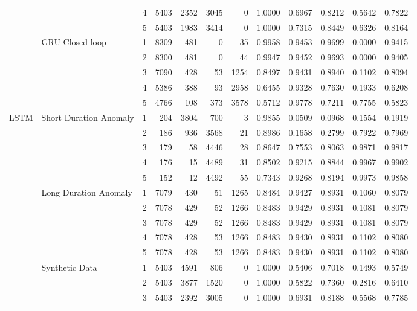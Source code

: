 \begin{table}[p]
{\begin{tabular}{|l|l|c|r|r|r|r|c|c|c|c|c|}
 &  & 4 & 5403 & 2352 & 3045 & 0 & 1.0000 & 0.6967 & 0.8212 & 0.5642 & 0.7822 \\
 &  & 5 & 5403 & 1983 & 3414 & 0 & 1.0000 & 0.7315 & 0.8449 & 0.6326 & 0.8164 \\
\cline{2-12}
 & \multirow{5}{*}{GRU Closed-loop} & 1 & 8309 & 481 & 0 & 35 & 0.9958 & 0.9453 & 0.9699 & 0.0000 & 0.9415 \\
 &  & 2 & 8300 & 481 & 0 & 44 & 0.9947 & 0.9452 & 0.9693 & 0.0000 & 0.9405 \\
 &  & 3 & 7090 & 428 & 53 & 1254 & 0.8497 & 0.9431 & 0.8940 & 0.1102 & 0.8094 \\
 &  & 4 & 5386 & 388 & 93 & 2958 & 0.6455 & 0.9328 & 0.7630 & 0.1933 & 0.6208 \\
 &  & 5 & 4766 & 108 & 373 & 3578 & 0.5712 & 0.9778 & 0.7211 & 0.7755 & 0.5823 \\
\hline
\multirow{20}{*}{LSTM} & \multirow{5}{*}{Short Duration Anomaly} & 1 & 204 & 3804 & 700 & 3 & 0.9855 & 0.0509 & 0.0968 & 0.1554 & 0.1919 \\
 &  & 2 & 186 & 936 & 3568 & 21 & 0.8986 & 0.1658 & 0.2799 & 0.7922 & 0.7969 \\
 &  & 3 & 179 & 58 & 4446 & 28 & 0.8647 & 0.7553 & 0.8063 & 0.9871 & 0.9817 \\
 &  & 4 & 176 & 15 & 4489 & 31 & 0.8502 & 0.9215 & 0.8844 & 0.9967 & 0.9902 \\
 &  & 5 & 152 & 12 & 4492 & 55 & 0.7343 & 0.9268 & 0.8194 & 0.9973 & 0.9858 \\
\cline{2-12}
 & \multirow{5}{*}{Long Duration Anomaly} & 1 & 7079 & 430 & 51 & 1265 & 0.8484 & 0.9427 & 0.8931 & 0.1060 & 0.8079 \\
 &  & 2 & 7078 & 429 & 52 & 1266 & 0.8483 & 0.9429 & 0.8931 & 0.1081 & 0.8079 \\
 &  & 3 & 7078 & 429 & 52 & 1266 & 0.8483 & 0.9429 & 0.8931 & 0.1081 & 0.8079 \\
 &  & 4 & 7078 & 428 & 53 & 1266 & 0.8483 & 0.9430 & 0.8931 & 0.1102 & 0.8080 \\
 &  & 5 & 7078 & 428 & 53 & 1266 & 0.8483 & 0.9430 & 0.8931 & 0.1102 & 0.8080 \\
\cline{2-12}
 & \multirow{5}{*}{Synthetic Data} & 1 & 5403 & 4591 & 806 & 0 & 1.0000 & 0.5406 & 0.7018 & 0.1493 & 0.5749 \\
 &  & 2 & 5403 & 3877 & 1520 & 0 & 1.0000 & 0.5822 & 0.7360 & 0.2816 & 0.6410 \\
 &  & 3 & 5403 & 2392 & 3005 & 0 & 1.0000 & 0.6931 & 0.8188 & 0.5568 & 0.7785 \\

\end{tabular}}
\end{table}
